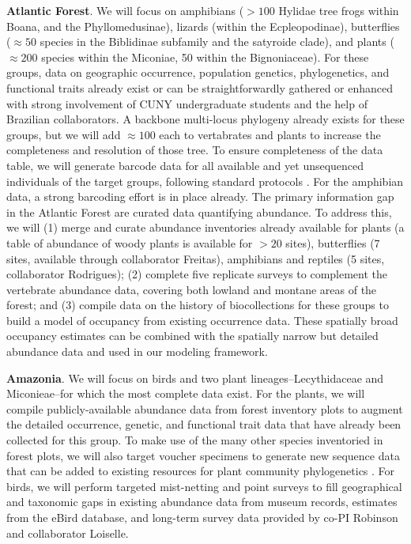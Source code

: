 \documentclass[11pt]{article}
\begin{document}
\textbf{Atlantic Forest}. We will focus on amphibians ($> 100$ Hylidae
tree frogs within Boana, and the Phyllomedusinae), lizards (within the
Ecpleopodinae), butterflies ($\approx 50$ species in the Biblidinae
subfamily and the satyroide clade), and plants ($\approx 200$ species
within the Miconiae, 50 within the Bignoniaceae). For these groups,
data on geographic occurrence, population genetics, phylogenetics, and
functional traits already exist or can be straightforwardly gathered
or enhanced with strong involvement of CUNY undergraduate students and
the help of Brazilian collaborators. A backbone multi-locus phylogeny
already exists for these groups, but we will add $\approx 100$ each to
vertabrates and plants to increase the completeness and resolution of
those tree. To ensure completeness of the data table, we will generate
barcode data for all available and yet unsequenced individuals of the
target groups, following standard protocols \cite{che2012,
  Krehenwinkel2017-zk, bi2018chloroplast}. For the amphibian data, a
strong barcoding effort is in place already.  The primary information
gap in the Atlantic Forest are curated data quantifying abundance. To
address this, we will (1) merge and curate abundance inventories
already available for plants (a table of abundance of woody plants is
available for $> 20$ sites), butterflies (7 sites, available through
collaborator Freitas), amphibians and reptiles (5 sites, collaborator
Rodrigues); (2) complete five replicate surveys to complement the
vertebrate abundance data, covering both lowland and montane areas of
the forest; and (3) compile data on the history of biocollections for
these groups to build a model of occupancy from existing occurrence
data. These spatially broad occupancy estimates can be combined with
the spatially narrow but detailed abundance data and used in our
modeling framework.

\textbf{Amazonia}. We will focus on birds and two plant
lineages--Lecythidaceae and Miconieae--for which the most complete
data exist. For the plants, we will compile publicly-available
abundance data from forest inventory plots
\cite{Lopez-Gonzalez2011-wr, Ter_Steege2011-yr, Rainfor2018-so} to
augment the detailed occurrence, genetic, and functional trait data
that have already been collected for this group. To make use of the
many other species inventoried in forest plots, we will also target
voucher specimens to generate new sequence data that can be added to
existing resources for plant community phylogenetics
\cite{webb2008phylocom, Harmon2013-wb}.  For birds, we will perform
targeted mist-netting and point surveys to fill geographical and
taxonomic gaps in existing abundance data from museum records,
estimates from the eBird database, and long-term survey data provided
by co-PI Robinson and collaborator Loiselle.
\end{document}
